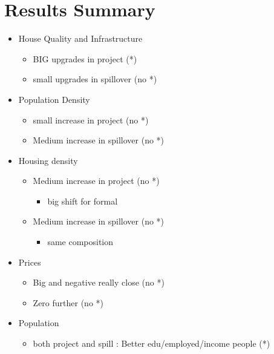 \documentclass[12pt]{article}
\begin{document}
{}

\section*{ Results Summary }

\begin{itemize}
	\item House Quality and Infrastructure
		\begin{itemize}
			\item BIG upgrades in project (*)
			\item small upgrades in spillover (no *)
		\end{itemize}

	\item Population Density
		\begin{itemize}
			\item small increase in project (no *)
			\item Medium increase in spillover (no *)
		\end{itemize}

	\item Housing density
		\begin{itemize}
			\item Medium increase in project (no *)
				\begin{itemize}
					\item big shift for formal
				\end{itemize}
			\item Medium increase in spillover (no *)
				\begin{itemize}
					\item same composition
				\end{itemize}
		\end{itemize}

	\item Prices
		\begin{itemize}
			\item Big and negative really close (no *)
			\item Zero further (no *)
		\end{itemize}		

	\item Population 
		\begin{itemize}
			\item both project and spill : Better edu/employed/income people (*)
		\end{itemize}
\end{itemize}
\end{document}
